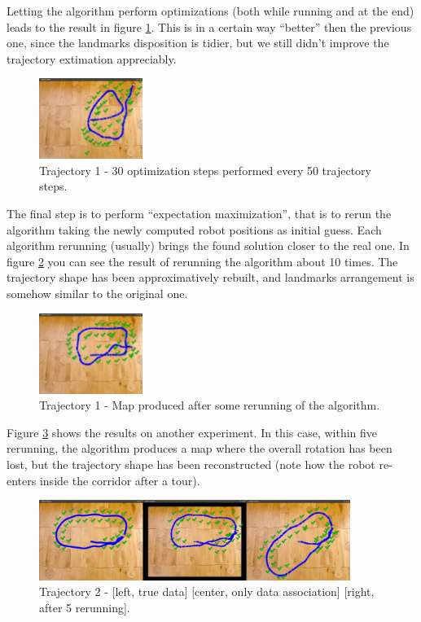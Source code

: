 Letting the algorithm perform optimizations (both while running and at the end) leads to the result in figure \ref{fig:corridor_optim}. This is in a certain way ``better'' then the previous one, since the landmarks disposition is tidier, but we still didn't improve the trajectory extimation appreciably.
\begin{figure}[htbp]
  \centering
    \includegraphics[width=0.3\textwidth]{images/corridor/corridor_optim.png}
  \caption{Trajectory 1 - 30 optimization steps performed every 50 trajectory steps.}
  \label{fig:corridor_optim}
\end{figure}

The final step is to perform ``expectation maximization'', that is to rerun the algorithm taking the newly computed robot positions as initial guess. Each algorithm rerunning (usually) brings the found solution closer to the real one. In figure \ref{fig:corridor_em} you can see the result of rerunning the algorithm about 10 times. The trajectory shape has been approximatively rebuilt, and landmarks arrangement is somehow similar to the original one.
\begin{figure}[htbp]
  \centering
    \includegraphics[width=0.3\textwidth]{images/corridor/corridor_rerun10.png}
  \caption{Trajectory 1 - Map produced after some rerunning of the algorithm.}
  \label{fig:corridor_em}
\end{figure}

Figure \ref{fig:corridor2} shows the results on another experiment. In this case, within five rerunning, the algorithm produces a map where the overall rotation has been lost, but the trajectory shape has been reconstructed (note how the robot re-enters inside the corridor after a tour).
\begin{figure}[htbp]
  \centering
    \includegraphics[width=0.9\textwidth]{images/corridor/corridor2.png}
  \caption{Trajectory 2 - [left, true data] [center, only data association] [right, after 5 rerunning].}
  \label{fig:corridor2}
\end{figure}

